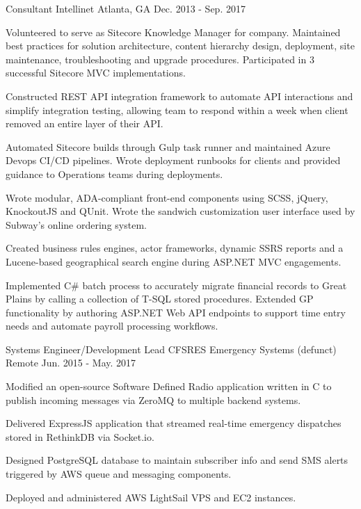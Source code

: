 \begin{cventries}
  \cventry
    {Consultant} %
    {Intellinet} %
    {Atlanta, GA} %
    {Dec. 2013 - Sep. 2017} %
    {
      \begin{cvitems} %
      	\item {Volunteered to serve as Sitecore Knowledge Manager for company. Maintained best practices for solution architecture, content hierarchy design, deployment, site maintenance, troubleshooting and upgrade procedures. Participated in 3 successful Sitecore MVC implementations.}
        \item {Constructed REST API integration framework to automate API interactions and simplify integration testing, allowing team to respond within a week when client removed an entire layer of their API.}
        \item {Automated Sitecore builds through Gulp task runner and maintained Azure Devops CI/CD pipelines. Wrote deployment runbooks for clients and provided guidance to Operations teams during deployments.}
        \item {Wrote modular, ADA-compliant front-end components using SCSS, jQuery, KnockoutJS and QUnit. Wrote the sandwich customization user interface used by Subway's online ordering system.}
        \item {Created business rules engines, actor frameworks, dynamic SSRS reports and a Lucene-based geographical search engine during ASP.NET MVC engagements.}
        \item {Implemented C\# batch process to accurately migrate financial records to Great Plains by calling a collection of T-SQL stored procedures. Extended GP functionality by authoring ASP.NET Web API endpoints to support time entry needs and automate payroll processing workflows.}
      \end{cvitems}
    }

  \cventry
    {Systems Engineer/Development Lead} %
    {CFSRES Emergency Systems (defunct)} %
    {Remote} %
    {Jun. 2015 - May. 2017} %
    {
      \begin{cvitems} %
        \item {Modified an open-source Software Defined Radio application written in C to publish incoming messages via ZeroMQ to multiple backend systems.}
        \item {Delivered ExpressJS application that streamed real-time emergency dispatches stored in RethinkDB via Socket.io.}
        \item {Designed PostgreSQL database to maintain subscriber info and send SMS alerts triggered by AWS queue and messaging components.}
        \item {Deployed and administered AWS LightSail VPS and EC2 instances.}
      \end{cvitems}
    }


\end{cventries}

